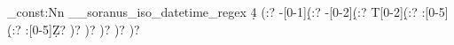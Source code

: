 %
%
%
% 
%

%

\regex_const:Nn \g__soranus_iso_datetime_regex
  {
    \d{4} %
    (:?
      -[0-1]\d %
      (:?
        -[0-2]\d %
        (:?
          T[0-2]\d %
          (:?
            :[0-5]\d %
            (:?
              :[0-5]\d %
              Z? %
            )?
          )?
        )?
      )?
    )?
  }
